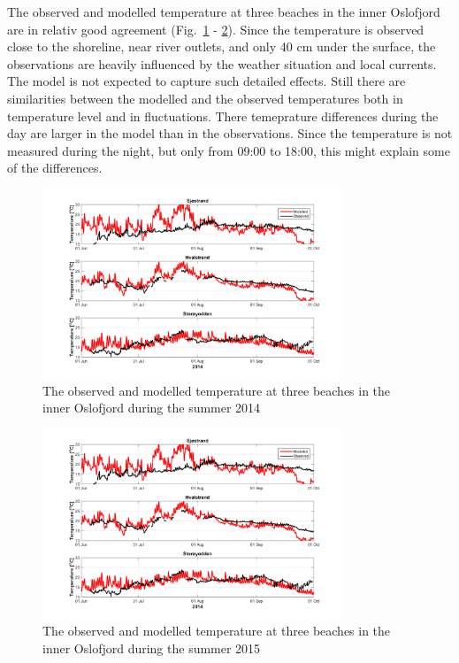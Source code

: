 \documentclass[12pt,a4paper,english]{article}
\begin{document}
The observed and modelled temperature at three beaches in the inner Oslofjord are in relativ good agreement (Fig.~\ref{fig:badetemp_2014} - \ref{fig:badetemp_2015}). Since the temperature is observed close to the shoreline, near river outlets, and only 40 cm under the surface, the observations are heavily influenced by the weather situation and local currents. The model is not expected to capture such detailed effects. Still there are similarities between the modelled and the observed temperatures both in temperature level and in fluctuations. There temeprature differences during the day are larger in the model than in the observations. Since the temperature is not measured during the night, but only from 09:00 to 18:00, this might explain some of the differences. 

\begin{figure}[ht]
\centerline{
\includegraphics*[trim=0 0 0 0,clip=true,width=0.8\textwidth]{Figurer/badetemp_2014}
}
\caption{\small
The observed and modelled temperature at three beaches in the inner Oslofjord during the summer 2014}
\label{fig:badetemp_2014}
\end{figure}

\begin{figure}[ht]
\centerline{
\includegraphics*[trim=0 0 0 0,clip=true,width=0.8\textwidth]{Figurer/badetemp_2014}
}
\caption{\small
The observed and modelled temperature at three beaches in the inner Oslofjord during the summer 2015}
\label{fig:badetemp_2015}
\end{figure}
\end{document}
